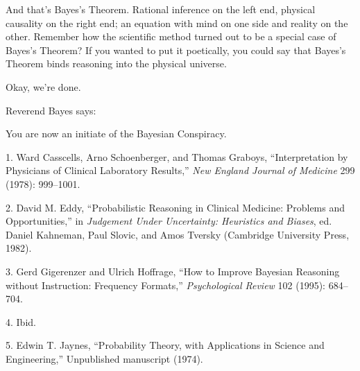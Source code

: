 {
 And that's Bayes's Theorem.
Rational inference on the left end, physical causality on the right
end; an equation with mind on one side and reality on the other.
Remember how the scientific method turned out to be a special case of
Bayes's Theorem? If you wanted to put it poetically,
you could say that Bayes's Theorem binds reasoning into
the physical universe.}

{
 Okay, we're done.}

{\centering
 Reverend Bayes says:\newline
 
 \newline
 You are now an initiate of the Bayesian Conspiracy.
\par}


\bigskip

\myendsectiontext


\bigskip

{
 1. Ward Casscells, Arno Schoenberger, and Thomas Graboys,
``Interpretation by Physicians of Clinical Laboratory
Results,'' \textit{New England Journal of Medicine}
299 (1978): 999--1001.}

{
 2. David M. Eddy, ``Probabilistic Reasoning in
Clinical Medicine: Problems and Opportunities,'' in
\textit{Judgement Under Uncertainty: Heuristics and Biases}, ed. Daniel
Kahneman, Paul Slovic, and Amos Tversky (Cambridge University Press,
1982).}

{
 3. Gerd Gigerenzer and Ulrich Hoffrage, ``How to
Improve Bayesian Reasoning without Instruction: Frequency
Formats,'' \textit{Psychological Review} 102 (1995):
684--704.}

{
 4. Ibid.}

{
 5. Edwin T. Jaynes, ``Probability Theory, with
Applications in Science and Engineering,''
Unpublished manuscript (1974).}



